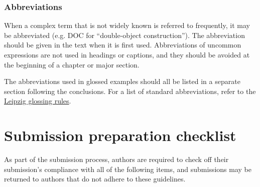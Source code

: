 \documentclass[charis,linguex,biblatex]{glossa}
\begin{document}
\subsubsection{Abbreviations}
When a complex term that is not widely known is referred to frequently, it may be abbreviated (e.g. DOC for ``double-object construction''). The abbreviation should be given in the text when it is first used. Abbreviations of uncommon expressions are not used in headings or captions, and they should be avoided at the beginning of a chapter or major section.

The abbreviations used in glossed examples should all be listed in a separate section following the conclusions. For a list of standard abbreviations, refer to the \href{https://www.eva.mpg.de/lingua/resources/glossing-rules.php}{Leipzig glossing rules}. 



\section{Submission preparation checklist}

As part of the submission process, authors are required to check off their submission's compliance with all of the following items, and submissions may be returned to authors that do not adhere to these guidelines.
\end{document}

